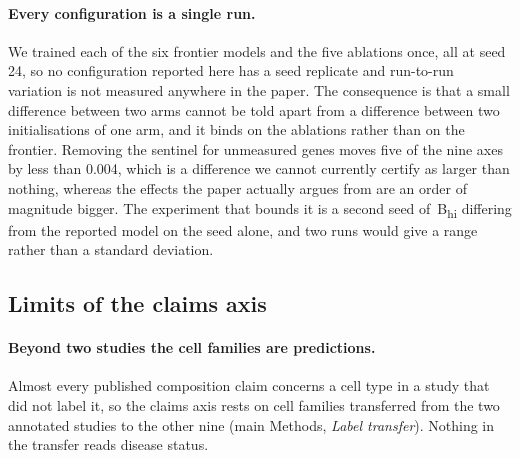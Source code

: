 \paragraph{Every configuration is a single run.} We trained each of the six
frontier models and the five ablations once, all at seed 24, so no
configuration reported here has a seed replicate and run-to-run variation
is not measured anywhere in the paper. The consequence is that a small
difference between two arms cannot be told apart from a difference between
two initialisations of one arm, and it binds on the ablations rather than
on the frontier. Removing the sentinel for unmeasured genes moves five of
the nine axes by less than 0.004, which is a difference we cannot currently
certify as larger than nothing, whereas the effects the paper actually
argues from are an order of magnitude bigger. The experiment that bounds it
is a second seed of \elaj\,B\textsubscript{hi} differing from the reported
model on the seed alone, and two runs would give a range rather than a
standard deviation.

\subsection{Limits of the claims axis}

\paragraph{Beyond two studies the cell families are predictions.} Almost
every published composition claim concerns a cell type in a study that did
not label it, so the claims axis rests on cell families transferred from the
two annotated studies to the other nine (main Methods, \emph{Label
transfer}). Nothing in the transfer reads disease status.

\begin{table}[t]
\centering
\caption[Transfer validation]{\textbf{Validation of the cell-family
transfer.} The two cross-study rows predict one annotated study from the
other; the two \texttt{li\_2025} rows are the out-of-tissue test, the
second of them a group for which no correct answer exists. Balanced
accuracy weights the four families equally.}
\label{stab:transfer-val}
\small

\end{table}

